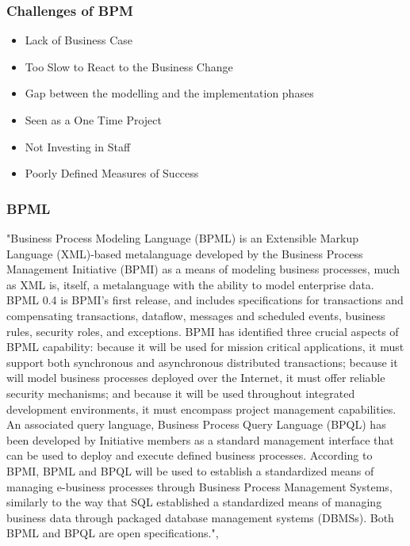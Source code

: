 \documentclass[12pt]{article}
\begin{document}
\subsubsection{Challenges of BPM \cite{bpmchall}}
\begin{itemize}
\item Lack of Business Case
\item Too Slow to React to the Business Change
\item Gap between the modelling and the implementation phases
\item Seen as a One Time Project 
\item Not Investing in Staff
\item Poorly Defined Measures of Success 
\end{itemize}
\subsubsection{BPML}
"Business Process Modeling Language (BPML) is an Extensible Markup Language (XML)-based metalanguage developed by the Business Process Management Initiative (BPMI) as a means of modeling business processes, much as XML is, itself, a metalanguage with the ability to model enterprise data. BPML 0.4 is BPMI's first release, and includes specifications for transactions and compensating transactions, dataflow, messages and scheduled events, business rules, security roles, and exceptions. BPMI has identified three crucial aspects of BPML capability: because it will be used for mission critical applications, it must support both synchronous and asynchronous distributed transactions; because it will model business processes deployed over the Internet, it must offer reliable security mechanisms; and because it will be used throughout integrated development environments, it must encompass project management capabilities.\\ An associated query language, Business Process Query Language (BPQL) has been developed by Initiative members as a standard management interface that can be used to deploy and execute defined business processes. According to BPMI, BPML and BPQL will be used to establish a standardized means of managing e-business processes through Business Process Management Systems, similarly to the way that SQL established a standardized means of managing business data through packaged database management systems (DBMSs). Both BPML and BPQL are open specifications.", \cite{bpmldefmr}
\end{document}
